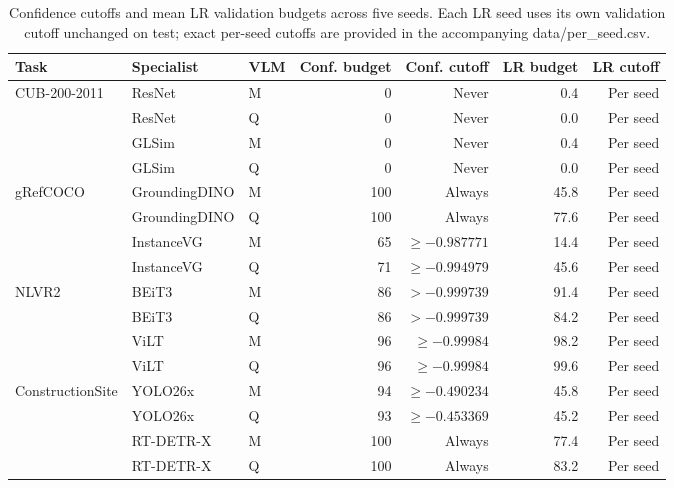 \begin{table}[H]
\centering
\caption{Confidence cutoffs and mean LR validation budgets across five seeds. Each LR seed uses its own validation cutoff unchanged on test; exact per-seed cutoffs are provided in the accompanying data/per\_seed.csv.}
\label{tab:thresholds}
\fontsize{9}{10.799999999999999}\selectfont
\setlength{\tabcolsep}{4pt}
\renewcommand{\arraystretch}{1.12}
\begin{tabular}{@{}lllrrrr@{}}
\toprule
Task & Specialist & VLM & Conf. budget & Conf. cutoff & LR budget & LR cutoff \\
\midrule
CUB-200-2011 & ResNet & M & 0 & Never & 0.4 & Per seed \\
 & ResNet & Q & 0 & Never & 0.0 & Per seed \\
 & GLSim & M & 0 & Never & 0.4 & Per seed \\
 & GLSim & Q & 0 & Never & 0.0 & Per seed \\
\midrule
gRefCOCO & GroundingDINO & M & 100 & Always & 45.8 & Per seed \\
 & GroundingDINO & Q & 100 & Always & 77.6 & Per seed \\
 & InstanceVG & M & 65 & $\geq-0.987771$ & 14.4 & Per seed \\
 & InstanceVG & Q & 71 & $\geq-0.994979$ & 45.6 & Per seed \\
\midrule
NLVR2 & BEiT3 & M & 86 & $>-0.999739$ & 91.4 & Per seed \\
 & BEiT3 & Q & 86 & $>-0.999739$ & 84.2 & Per seed \\
 & ViLT & M & 96 & $\geq-0.99984$ & 98.2 & Per seed \\
 & ViLT & Q & 96 & $\geq-0.99984$ & 99.6 & Per seed \\
\midrule
ConstructionSite & YOLO26x & M & 94 & $\geq-0.490234$ & 45.8 & Per seed \\
 & YOLO26x & Q & 93 & $\geq-0.453369$ & 45.2 & Per seed \\
 & RT-DETR-X & M & 100 & Always & 77.4 & Per seed \\
 & RT-DETR-X & Q & 100 & Always & 83.2 & Per seed \\
\bottomrule
\end{tabular}
\end{table}

